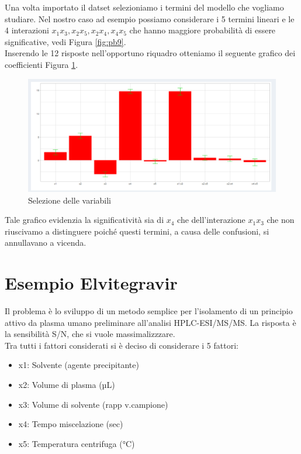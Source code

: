 \documentclass[
  11pt,
]{book}
\providecommand{\tightlist}{%
  \setlength{\itemsep}{0pt}\setlength{\parskip}{0pt}}
\begin{document}
Una volta importato il datset selezioniamo i termini del modello che vogliamo studiare. Nel nostro caso ad esempio possiamo considerare i 5 termini lineari e le 4 interazioni \(x_1x_3,x_2x_5,x_2x_4,x_4x_5\) che hanno maggiore probabilità di essere significative, vedi Figura \ref{fig:pb9}.\\
Inserendo le 12 risposte nell'opportuno riquadro otteniamo il seguente grafico dei coefficienti Figura \ref{fig:pb11}.

\begin{figure}[ht]

{\centering \includegraphics[width=1\linewidth]{Immagini/PB/11_pp2} 

}

\caption{Selezione delle variabili}\label{fig:pb11}
\end{figure}

Tale grafico evidenzia la significatività sia di \(x_4\) che dell'interazione \(x_1x_3\) che non riuscivamo a distinguere poiché questi termini, a causa delle confusioni, si annullavano a vicenda.

\hypertarget{esempio-elvitegravir}{%
\section{Esempio Elvitegravir}\label{esempio-elvitegravir}}

Il problema è lo sviluppo di un metodo semplice per l'isolamento di un principio attivo da plasma umano preliminare all'analisi HPLC-ESI/MS/MS. La risposta è la sensibilità S/N, che si vuole massimalizzzare.\\
Tra tutti i fattori considerati si è deciso di considerare i 5 fattori:

\begin{itemize}
\tightlist
\item
  x1: Solvente (agente precipitante)
\item
  x2: Volume di plasma (µL)
\item
  x3: Volume di solvente (rapp v.campione)
\item
  x4: Tempo miscelazione (sec)
\item
  x5: Temperatura centrifuga (°C)
\end{itemize}
\end{document}

